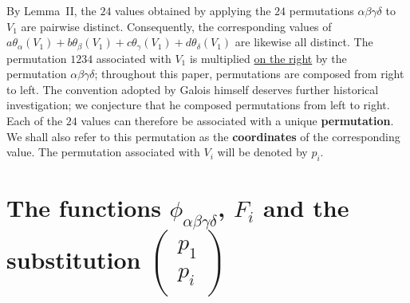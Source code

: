 \documentclass[a4paper,11pt]{article}
\begin{document}
By Lemma~II, the \(24\) values obtained by applying the \(24\) permutations \(\alpha\beta\gamma\delta\) to \(V_1\) are pairwise distinct. Consequently, the corresponding values of
\(a\theta_\alpha(V_1)+b\theta_\beta(V_1)+c\theta_\gamma(V_1)+d\theta_\delta(V_1)\)
are likewise all distinct. The permutation \(1234\) associated with \(V_1\) is multiplied \underline{on the right} by the permutation \(\alpha\beta\gamma\delta\); throughout this paper, permutations are composed from right to left. The convention adopted by Galois himself deserves further historical investigation; we conjecture that he composed permutations from left to right. Each of the \(24\) values can therefore be associated with a unique \textbf{permutation}. We shall also refer to this permutation as the \textbf{coordinates} of the corresponding value. The permutation associated with \(V_i\) will be denoted by \(p_i\).

\section{The functions \(\phi_{\alpha\beta\gamma\delta}\), \(F_i\) and the substitution
	\(
	\left(
	\begin{array}{c}
		p_1\\
		p_i
	\end{array}
	\right)
	\)
}
\end{document}
